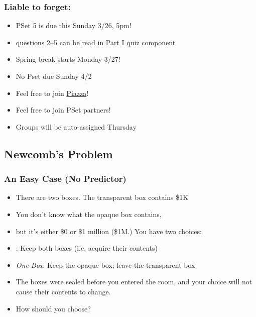 \begin{frame}
\frametitle{Liable to forget:}

\begin{itemize}[<+->]

\item PSet 5 is due this Sunday 3/26, 5pm!

\item[] questions 2--5 can be read in Part I quiz component %

\item Spring break starts Monday 3/27! 

\item[] No Pset due Sunday 4/2

\item Feel free to join \href{https://piazza.com/mit/spring2023/24118}{Piazza}! 

\item Feel free to join PSet partners!
\item[] Groups will be auto-assigned Thursday 


\end{itemize}
\end{frame}

\subsection{Newcomb's Problem}

\begin{frame}
\frametitle{An Easy Case (No Predictor)}

\begin{itemize}[<+->]
\item There are two boxes. The transparent box contains \$1K

\item You don't know what the opaque box contains, 

\item[] but it's either \$0 or \$1 million (\$1M.) You have two choices: 

\item[] : Keep both boxes (i.e. acquire their contents)
\item[] \emph{One-Box}: Keep the opaque box; leave the transparent box

\item The boxes were sealed before you entered the room, and your choice will not cause their contents to change. 

\item How should you choose?

\end{itemize}
\end{frame}


